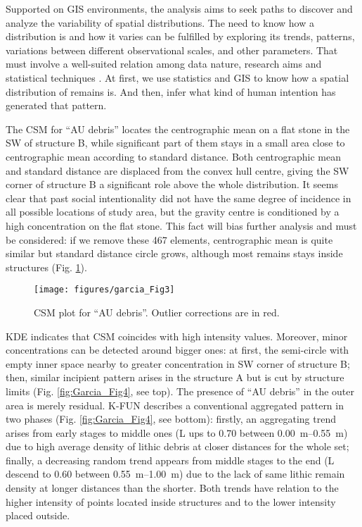 Supported on GIS environments, the analysis aims to seek paths to discover and analyze the variability of spatial distributions. The need to know how a distribution is and how it varies can be fulfilled by exploring its trends, patterns, variations between different observational scales, and other parameters. That must involve a well-suited relation among data nature, research aims and statistical techniques \parencites{Anselin_1999}{Bivand_2010}. At first, we use statistics and GIS to know how a spatial distribution of remains is. And then, infer what kind of human intention has generated that pattern. 


The CSM for “AU debris” locates the centrographic mean on a flat stone in the SW of structure B, while significant part of them stays in a small area close to centrographic mean according to standard distance. Both centrographic mean and standard distance are displaced from the convex hull centre, giving the SW corner of structure B a significant role above the whole distribution. It seems clear that past social intentionality did not have the same degree of incidence in all possible locations of study area, but the gravity centre is conditioned by a high concentration on the flat stone. This fact will bias further analysis and must be considered: if we remove these 467 elements, centrographic mean is quite similar but standard distance circle grows, although most remains stays inside structures (Fig. \ref{fig:Garcia_Fig3}).

\begin{figure}
	\texttt{[image: figures/garcia\_Fig3]}
	\centering
	\caption{CSM plot for “AU debris”. Outlier corrections are in red.}
	\label{fig:Garcia_Fig3}
\end{figure}

KDE indicates that CSM coincides with high intensity values. Moreover, minor concentrations can be detected around bigger ones: at first, the semi-circle with empty inner space nearby to greater concentration in SW corner of structure B; then, similar incipient pattern arises in the structure A but is cut by structure limits (Fig. \ref{fig:Garcia_Fig4}, see top). The presence of “AU debris” in the outer area is merely residual. K-FUN describes a conventional aggregated pattern in two phases (Fig. \ref{fig:Garcia_Fig4}, see bottom): firstly, an aggregating trend arises from early stages to middle ones (L ups to 0.70 between \SIrange{0.00}{0.55}{\metre}) due to high average density of lithic debris at closer distances for the whole set; finally, a decreasing random trend appears from middle stages to the end (L descend to 0.60 between \SIrange{0.55}{1.00}{\metre}) due to the lack of same lithic remain density at longer distances than the shorter. Both trends have relation to the higher intensity of points located inside structures and to the lower intensity placed outside.

